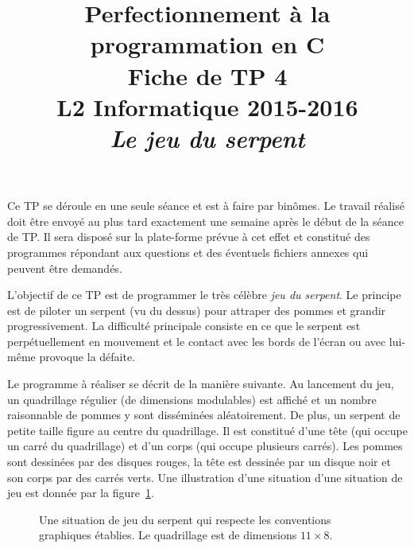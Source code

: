 \documentclass[12pt]{article}
\date{}
\title{{\bf Perfectionnement à la programmation en {\sf C}} \\
    Fiche de TP 4 \\
    {\small L2 Informatique 2015-2016} \\
    {\it \small Le jeu du serpent}}
\theoremstyle{definition}
\begin{document}
\maketitle

Ce TP se déroule en une seule séance et est à faire par binômes.
Le travail réalisé doit être envoyé au plus tard exactement une
semaine après le début de la séance de TP. Il sera disposé sur
la plate-forme prévue à cet effet et constitué des programmes
répondant aux questions et des éventuels fichiers annexes qui
peuvent être demandés.
\bigskip
\bigskip

L'objectif de ce TP est de programmer le très célèbre {\em jeu du serpent}.
Le principe est de piloter un serpent (vu du dessus) pour attraper des
pommes et grandir progressivement. La difficulté principale consiste en
ce que le serpent est perpétuellement en mouvement et le contact avec
les bords de l'écran ou avec lui-même provoque la défaite.
\smallskip

Le programme à réaliser se décrit de la manière suivante. Au lancement
du jeu, un quadrillage régulier (de dimensions modulables) est affiché
et un nombre raisonnable de pommes y sont disséminées aléatoirement. De
plus, un serpent de petite taille figure au centre du quadrillage. Il est
constitué d'une tête (qui occupe un carré du quadrillage) et d'un corps
(qui occupe plusieurs carrés). Les pommes sont dessinées par des disques
rouges, la tête est dessinée par un disque noir et son corps par
des carrés verts. Une illustration d'une situation d'une situation
de jeu est donnée par la figure~\ref{fig:quadrillage}.
\begin{figure}[ht]
    \centering
    \caption{Une situation de jeu du serpent qui respecte les conventions
    graphiques établies. Le quadrillage est de dimensions $11 \times 8$.}
    \label{fig:quadrillage}
\end{figure}
\smallskip
\end{document}

